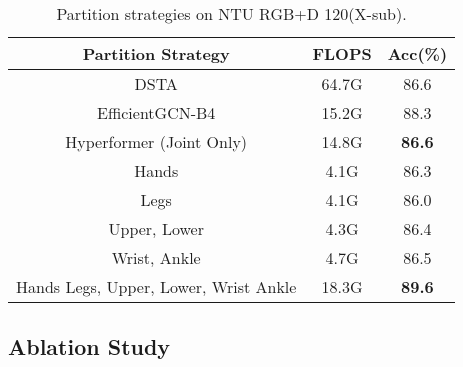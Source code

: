 \documentclass{bmvc2k}
\begin{document}
\begin{table}[]
\caption{Partition strategies on NTU RGB+D 120(X-sub).}
\label{table:data_type1}
\centering
\small
\begin{tabular}{ccc}
\hline
Partition Strategy                              & FLOPS & Acc(\%)       \\ \hline
DSTA \cite{dstanet_accv2020}                    & 64.7G & 86.6          \\
EfficientGCN-B4 \cite{song2022constructing}     & 15.2G & 88.3          \\
Hyperformer (Joint Only) \cite{Yuxuan_2023}     & 14.8G & \textbf{86.6} \\
Hands                                           & 4.1G  & 86.3          \\
Legs                                            & 4.1G  & 86.0          \\
Upper, Lower                                    & 4.3G  & 86.4          \\
Wrist, Ankle                                    & 4.7G  & 86.5          \\
Hands Legs, Upper, Lower, Wrist Ankle           & 18.3G & \textbf{89.6} \\ \hline
\end{tabular}
\label{table-body-part}
\end{table}



\subsection{Ablation Study}
\end{document}
